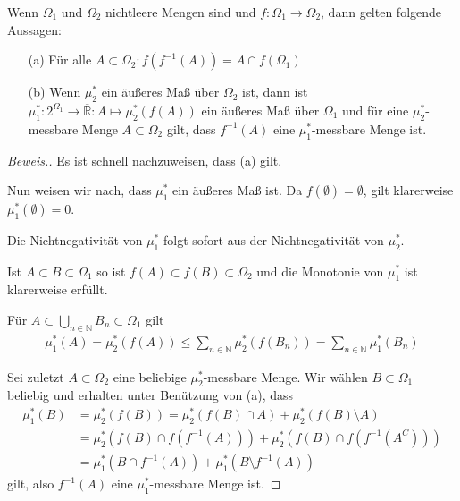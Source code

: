 \begin{lemma}
    Wenn $\Omega_1$ und $\Omega_2$ nichtleere Mengen sind und $f:\Omega_1\rightarrow\Omega_2$, dann gelten folgende Aussagen:
    \begin{itemize}
        \item[(a)] Für alle $A\subset\Omega_2:f(f^{-1}(A))=A\cap f(\Omega_1)$
        \item[(b)] Wenn $\mu_2^*$ ein äußeres Maß über $\Omega_2$ ist, dann ist $\mu_1^*:2^{\Omega_1}\rightarrow\overline{\mathbb{R}}:A\mapsto\mu_2^*(f(A))$ ein äußeres Maß über $\Omega_1$ und für eine $\mu_2^*$-messbare Menge $A\subset\Omega_2$ gilt, dass $f^{-1}(A)$ eine $\mu_1^*$-messbare Menge ist.
    \end{itemize}
\end{lemma}
\begin{proof}[Beweis.]
    Es ist schnell nachzuweisen, dass (a) gilt.

    Nun weisen wir nach, dass $\mu_1^*$ ein äußeres Maß ist. Da $f(\emptyset)=\emptyset$, gilt klarerweise $\mu_1^*(\emptyset)=0$. 

    Die Nichtnegativität von $\mu_1^*$ folgt sofort aus der Nichtnegativität von $\mu_2^*$. 

    Ist $A\subset B\subset\Omega_1$ so ist $f(A)\subset f(B)\subset\Omega_2$ und die Monotonie von $\mu^*_1$ ist klarerweise erfüllt.

    Für $A\subset\bigcup_{n\in\mathbb{N}}B_n\subset\Omega_1$ gilt
    \begin{align*}
        \mu_1^*(A)=\mu_2^*(f(A))\leq\sum_{n\in\mathbb{N}}\mu_2^*(f(B_n))=\sum_{n\in\mathbb{N}}\mu_1^*(B_n)
    \end{align*}

    Sei zuletzt $A\subset\Omega_2$ eine beliebige $\mu_2^*$-messbare Menge. Wir wählen $B\subset\Omega_1$ beliebig und erhalten unter Benützung von (a), dass
    \begin{align*}
        \mu_1^*(B)&=\mu_2^*(f(B))=\mu_2^*(f(B)\cap A)+\mu_2^*(f(B)\setminus A)\\
        &=\mu_2^*\left(f(B)\cap f\left(f^{-1}(A)\right)\right)+\mu_2^*\left(f(B)\cap f\left(f^{-1}\left(A^C\right)\right)\right)\\
        &=\mu_1^*\left(B\cap f^{-1}(A)\right)+\mu_1^*\left(B\setminus f^{-1}(A)\right)
    \end{align*}
    gilt, also $f^{-1}(A)$ eine $\mu_1^*$-messbare Menge ist.
\end{proof}